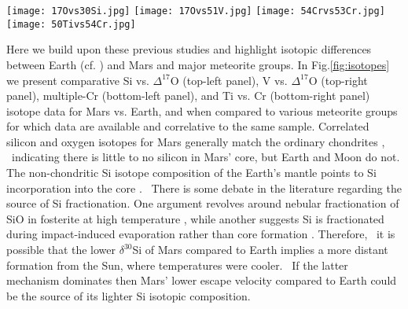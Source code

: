 \documentclass[preprint,5p,times,authoryear]{elsarticle}
\begin{document}
\begin{figure*}[ht!]
\texttt{[image: 17Ovs30Si.jpg]}
\texttt{[image: 17Ovs51V.jpg]}
\texttt{[image: 54Crvs53Cr.jpg]}
\texttt{[image: 50Tivs54Cr.jpg]}
\caption{Four-panel plot of the correlated comparative isotopic compositions of Earth (and Moon), Mars, Vesta (howardites, eucrites, 
diogenites, mesosiderites), EC (enstatite chondrites), OC (ordinary chondrites), and CC (carbonaceous chondrites). All data are 
normalised according to the terrestrial standard values. We only plot correlated data by sample, and not just averages, for each 
meteorite group. As such, differences that exist between different samples in, for example oxygen isotopes in the HEDs, become 
highlighted. Top-left: correlated oxygen vs. silicon. Top-right: correlated oxygen vs. vanadium. Bottom-left: correlated multiple 
chromium isotopes ($^{53}$Cr and $^{54}$Cr). Bottom-right: correlated titanium and chromium isotopes ($^{50}$Ti and $^{54}$Cr).}
\label{fig:isotopes}
\end{figure*}

Here we build upon these previous studies and highlight isotopic differences between Earth {(cf. \citet{J10})} and Mars and major 
meteorite groups. In Fig.\ref{fig:isotopes} we present comparative Si vs. $\Delta ^{17}$O (top-left panel), V vs. $\Delta ^{17}$O 
(top-right panel), multiple-Cr (bottom-left panel), and Ti vs. Cr (bottom-right panel) isotope data for Mars vs. Earth, and when 
compared to various meteorite groups for which data are available and correlative to the same sample. Correlated silicon and oxygen 
isotopes for Mars generally match the ordinary chondrites \citep{Georg07,P13a}, {\ indicating there is little to no silicon in Mars' 
core}, but Earth and Moon do not. The non-chondritic Si isotope composition of the Earth's mantle points to Si incorporation into the 
core \citep{Georg07}. {\ There is some debate in the literature regarding the source of Si fractionation. One argument revolves 
around nebular fractionation of SiO in fosterite at high temperature \citep{D15}, while another suggests Si is fractionated during 
impact-induced evaporation rather than core formation \citep{P14}.} Therefore, {\ it is possible} that the lower $\delta ^{30}$Si of 
Mars compared to Earth implies a more distant formation from the Sun, where temperatures were cooler. {\ If the latter mechanism 
dominates then Mars' lower escape velocity compared to Earth could be the source of its lighter Si isotopic composition.}\\
\end{document}
